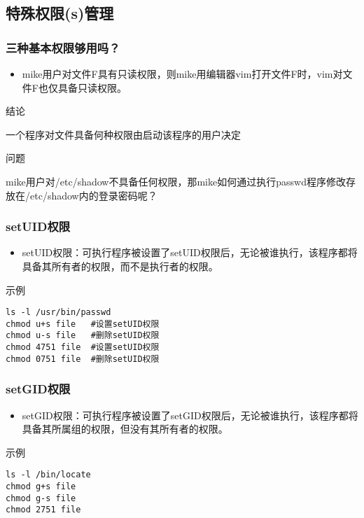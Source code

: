 \documentclass[xcolor=svgnames,presentation]{beamer}
\begin{document}
\subsection{特殊权限(s)管理}
\label{sec-2-3}
\begin{frame}
\frametitle{三种基本权限够用吗？}
\label{sec-2-3-1}
\begin{itemize}

\item mike用户对文件F具有只读权限，则mike用编辑器vim打开文件F时，vim对文件F也仅具备只读权限。
\label{sec-2-3-1-1}%
\end{itemize} %
\begin{exampleblock}{结论}
\label{sec-2-3-1-2}

一个程序对文件具备何种权限由启动该程序的用户决定
\end{exampleblock}
\begin{block}{问题}
\label{sec-2-3-1-3}

mike用户对/etc/shadow不具备任何权限，那mike如何通过执行passwd程序修改存放在/etc/shadow内的登录密码呢？
\end{block}
\end{frame}
\begin{frame}[fragile]
\frametitle{setUID权限}
\label{sec-2-3-2}
\begin{itemize}

\item setUID权限：可执行程序被设置了setUID权限后，无论被谁执行，该程序都将具备其所有者的权限，而不是执行者的权限。
\label{sec-2-3-2-1}%
\end{itemize} %
\begin{exampleblock}{示例}
\label{sec-2-3-2-2}


\begin{verbatim}
ls -l /usr/bin/passwd
chmod u+s file   #设置setUID权限
chmod u-s file   #删除setUID权限
chmod 4751 file  #设置setUID权限
chmod 0751 file  #删除setUID权限
\end{verbatim}
\end{exampleblock}
\end{frame}
\begin{frame}[fragile]
\frametitle{setGID权限}
\label{sec-2-3-3}
\begin{itemize}

\item setGID权限：可执行程序被设置了setGID权限后，无论被谁执行，该程序都将具备其所属组的权限，但没有其所有者的权限。
\label{sec-2-3-3-1}%
\end{itemize} %
\begin{exampleblock}{示例}
\label{sec-2-3-3-2}


\begin{verbatim}
ls -l /bin/locate
chmod g+s file
chmod g-s file
chmod 2751 file
\end{verbatim}
\end{exampleblock}
\end{frame}
\end{document}
